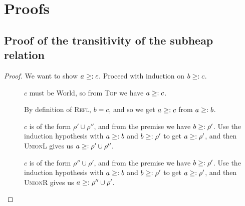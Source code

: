 \appendix
\chapter{Proofs}

\section{Proof of the transitivity of the subheap relation} \label{proof:subheaptransitive}
\begin{proof}
  We want to show $a \geq: c$. Proceed with induction on $b \geq: c$.
  \begin{description}
  \item[\rm{}]
    $c$ must be \textsf{World}, so from \textsc{Top} we have $a
    \geq: c$.
  \item[\rm{}] By definition of \textsc{Refl}, $b =
    c$, and so we get $a \geq: c$ from $a \geq: b$.
  \item[\rm{}] $c$ is of the form $\rho' \cup \rho''$, and
    from the premise we have $b \geq: \rho'$. Use the induction
    hypothesis with $a \geq: b$ and $b \geq: \rho'$ to get $a \geq:
    \rho'$, and then \textsc{UnionL} gives us $a \geq: \rho' \cup \rho''$.
  \item[\rm{}]  $c$ is of the form $\rho'' \cup \rho'$, and
    from the premise we have $b \geq: \rho'$. Use the induction
    hypothesis with $a \geq: b$ and $b \geq: \rho'$ to get $a \geq:
    \rho'$, and then \textsc{UnionR} gives us $a \geq: \rho'' \cup \rho'$.
  \end{description}
\end{proof}